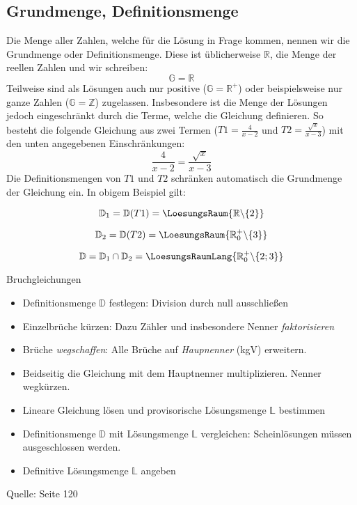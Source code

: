   
  \subsection{Grundmenge, Definitionsmenge}
  Die Menge aller Zahlen, welche für die Lösung in Frage kommen,
  nennen wir die Grundmenge oder Definitionsmenge. Diese ist üblicherweise $\mathbb{R}$, die
  Menge der reellen Zahlen und wir schreiben:
  $$\mathbb{G}=\mathbb{R}$$
  Teilweise sind als Lösungen auch nur positive ($\mathbb{G}=\mathbb{R}^+$) oder
  beispielsweise nur ganze Zahlen ($\mathbb{G}=\mathbb{Z}$)
  zugelassen.
  Insbesondere ist die Menge der Lösungen jedoch eingeschränkt durch
  die Terme, welche die Gleichung definieren. So besteht die folgende
  Gleichung aus zwei Termen ($T1=\frac{4}{x-2}$ und $T2=\frac{\sqrt{x}}{x-3}$) mit den unten angegebenen
  Einschränkungen:
  $$\frac{4}{x-2}=\frac{\sqrt{x}}{x-3}$$
  Die Definitionsmengen von $T1$ und $T2$ schränken automatisch die
  Grundmenge der Gleichung ein. In obigem Beispiel gilt:
  
  $$\mathbb{D}_1=\mathbb{D}(T1)=\LoesungsRaum{\mathbb{R}\backslash\{2\}}$$

  $$\mathbb{D}_2=\mathbb{D}(T2)=\LoesungsRaum{\mathbb{R}^+_0\backslash\{3\}}$$

  $$\mathbb{D}=\mathbb{D}_1\cap\mathbb{D}_2=\LoesungsRaumLang{\mathbb{R}^{+}_{0}\backslash\{2;3\}}$$

  \newpage
  
\begin{rezept}{Bruchgleichungen}{}
  \begin{itemize}
    \item Definitionsmenge $\mathbb{D}$ festlegen: Division durch null ausschließen
  \item Einzelbrüche kürzen: Dazu Zähler und insbesondere Nenner \textit{faktorisieren}
  \item Brüche \textit{wegschaffen}: Alle Brüche auf
    \textit{Haupnenner} (kgV) erweitern.
  \item Beidseitig die Gleichung mit dem Hauptnenner
    multiplizieren. Nenner wegkürzen.
  \item Lineare Gleichung lösen und provisorische Lösungsmenge $\mathbb{L}$
    bestimmen
  \item Definitionsmenge $\mathbb{D}$ mit Lösungsmenge $\mathbb{L}$
    vergleichen: Scheinlösungen müssen ausgeschlossen werden.
  \item Definitive Lösungsmenge $\mathbb{L}$ angeben
    \end{itemize}
  Quelle: \cite{marthaler17} Seite 120
\end{rezept}

\newpage

